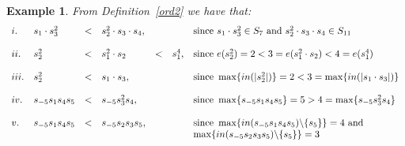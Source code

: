 \documentclass[11pt]{amsart}
\newtheorem{defn}{Definition}
\newtheorem{ex}{Example}
\begin{document}
\begin{ex}\rm
From Definition~\ref{ord2} we have that:
\[
\begin{array}{lllllll}
i. & s_1 \cdot s_3^2 & < & s_2^2\cdot s_3\cdot s_4, && & {\rm since}\ s_1 \cdot s_3^2\in S_7\ {\rm and}\ s_2^2\cdot s_3\cdot s_4\in S_{11}\\
&&&&&&\\
ii. & s_2^2           & < & s_1^2\cdot s_2 & < & s_1^4, & {\rm since}\ e(s_2^2)=2 < 3 = e(s_1^2\cdot s_2) < 4 = e(s_1^4)   \\
&&&&&&\\
iii. & s_2^2   & < & s_1\cdot s_3, &&& {\rm since}\ \max\{in(|s_2^2|) \} =2 < 3 = \max\{in(|s_1\cdot s_3|)\}\\
&&&&&&\\
iv. & s_{-5}s_1s_4s_5 & < & s_{-5}s_3^2s_4, &&& {\rm since}\ \max\{s_{-5}s_1s_4s_5\} = 5 > 4 = \max\{s_{-5}s_3^2s_4 \}\\
&&&&&&\\
v. & s_{-5}s_1s_4s_5   & < & s_{-5}s_2s_3s_5, &&& {\rm since}\ \max\{in(s_{-5}s_1s_4s_5)\backslash \{s_5\} \} =4\ {\rm and}\\
    &                  &     &                 &&&  \max\{in(s_{-5}s_2s_3s_5)\backslash \{s_5\}\}= 3 \\
\end{array}
\]
\end{ex}









\end{document}
